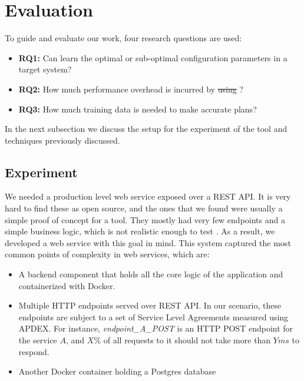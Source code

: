 

\section{Evaluation}

To guide and evaluate our work, four research questions are used:

\begin{itemize}
  \item \textbf{RQ1:} Can \projectname{} learn the optimal or sub-optimal configuration parameters in a target system?
  \item \textbf{RQ2:} How much performance overhead is incurred by \st{using} \projectname{}?
  \item \textbf{RQ3:} How much training data is needed to make accurate plans?
\end{itemize}

In the next subsection we discuss the setup for the experiment of the tool and techniques previously discussed.

\subsection{Experiment}

We needed a production level web service exposed over a REST API. It is very hard to find these as open source, and the ones that we found were usually a simple proof of concept for a tool. They mostly had very few endpoints and a simple business logic, which is not realistic enough to test \projectname{}. As a result, we developed a web service with this goal in mind. This system captured the most common points of complexity in web services, which are:

\begin{itemize}
  \item A backend component that holds all the core logic of the application and containerized with Docker.
  \item Multiple HTTP endpoints served over REST API. In our scenario, these endpoints are subject to a set of Service Level Agreements measured using APDEX. For instance, \textit{endpoint\_A\_POST} is an HTTP POST endpoint for the service $A$, and $X\%$ of all requests to it should not take more than $Y ms$ to respond.
  \item Another Docker container holding a Postgres database
\end{itemize}

